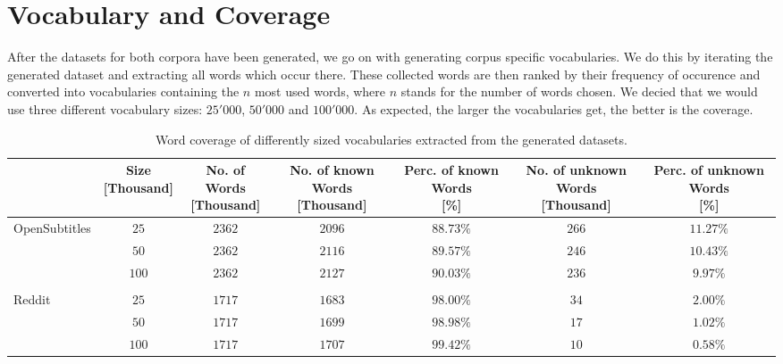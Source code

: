 \section{Vocabulary and Coverage}
\label{data:word_coverage}
After the datasets for both corpora have been generated, we go on with generating corpus specific vocabularies. We do this by iterating the generated dataset and extracting all words which occur there. These collected words are then ranked by their frequency of occurence and converted into vocabularies containing the $n$ most used words, where $n$ stands for the number of words chosen. We decied that we would use three different vocabulary sizes: $25'000$, $50'000$ and $100'000$. As expected, the larger the vocabularies get, the better is the coverage.
\\
\begin{table}[H]
	\begin{adjustbox}{max width=\textwidth}
		\centering
		\small
		\begin{tabular}{lcccccc}
			\toprule
			&\specialcell{Size\\ {[Thousand]}}
			&\specialcell{No. of Words\\ {[Thousand]}}
			&\specialcell{No. of known Words\\ {[Thousand]}}
			&\specialcell{Perc. of known Words \\ {[\%]}}
			&\specialcell{No. of unknown Words \\ {[Thousand]}}
			&\specialcell{Perc. of unknown Words \\ {[\%]}}\\
			\midrule
			OpenSubtitles	&$25$		&$2362$	&$2096$	&$88.73\%$ &$266$	&$11.27\%$\\
							&$50$		&$2362$	&$2116$	&$89.57\%$	&$246$	&$10.43\%$\\
							&$100$	&$2362$	&$2127$	&$90.03\%$	&$236$	&$9.97\%$\\\\
			Reddit		&$25$		&$1717$	&$1683$	&$98.00\%$	&$34$		&$2.00\%$\\
						&$50$		&$1717$	&$1699$	&$98.98\%$	&$17$		&$1.02\%$\\
						&$100$	&$1717$	&$1707$	&$99.42\%$	&$10$		&$0.58\%$\\
			\bottomrule
		\end{tabular}
	\end{adjustbox}
	\caption{Word coverage of differently sized vocabularies extracted from the generated datasets.}
	\label{tbl:data:split:corpus:analyze}
\end{table}


